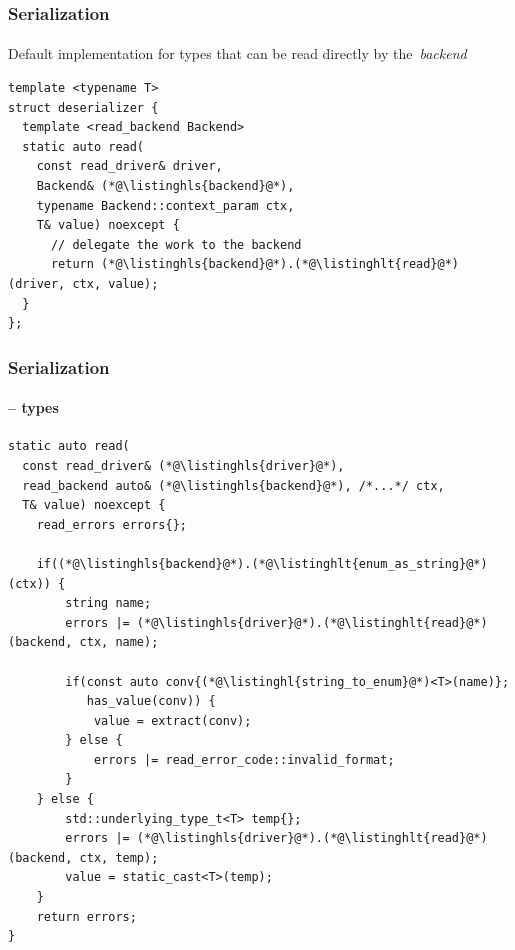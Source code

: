 \documentclass[compress,table,xcolor=table]{beamer}
\begin{document}
\begin{frame}[fragile]
  \frametitle{Serialization}
  \framesubtitle{}
  Default implementation for types that can be read directly by the~{\em backend}
  \begin{lstlisting}[language=c++2x,basicstyle=\small\ttfamily]
template <typename T>
struct deserializer {
  template <read_backend Backend>
  static auto read(
    const read_driver& driver,
    Backend& (*@\listinghls{backend}@*),
    typename Backend::context_param ctx,
    T& value) noexcept {
      // delegate the work to the backend
      return (*@\listinghls{backend}@*).(*@\listinghlt{read}@*)(driver, ctx, value);
  }
};
  \end{lstlisting}
\end{frame}
\begin{frame}[fragile]
  \frametitle{Serialization}
  \framesubtitle{ --  types}
  \begin{lstlisting}[language=c++2x,basicstyle=\scriptsize\ttfamily]
static auto read(
  const read_driver& (*@\listinghls{driver}@*),
  read_backend auto& (*@\listinghls{backend}@*), /*...*/ ctx,
  T& value) noexcept {
    read_errors errors{};

    if((*@\listinghls{backend}@*).(*@\listinghlt{enum_as_string}@*)(ctx)) {
        string name;
        errors |= (*@\listinghls{driver}@*).(*@\listinghlt{read}@*)(backend, ctx, name);

        if(const auto conv{(*@\listinghl{string_to_enum}@*)<T>(name)};
           has_value(conv)) {
            value = extract(conv);
        } else {
            errors |= read_error_code::invalid_format;
        }
    } else {
        std::underlying_type_t<T> temp{};
        errors |= (*@\listinghls{driver}@*).(*@\listinghlt{read}@*)(backend, ctx, temp);
        value = static_cast<T>(temp);
    }
    return errors;
}
  \end{lstlisting}
\end{frame}
\end{document}

